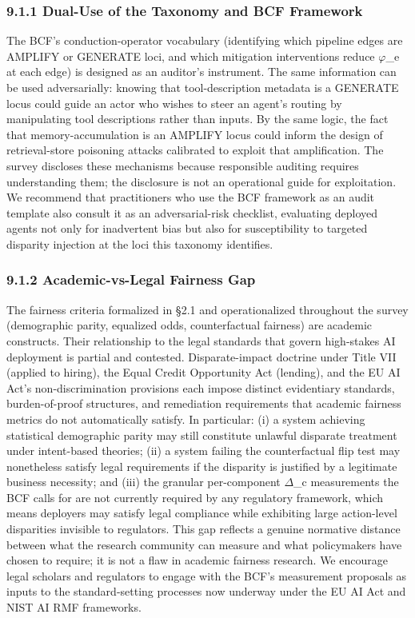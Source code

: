 \documentclass[10pt]{article}
\begin{document}
\subsubsection*{9.1.1 Dual-Use of the Taxonomy and BCF Framework}

The BCF's conduction-operator vocabulary (identifying which pipeline edges are AMPLIFY or GENERATE loci, and which mitigation interventions reduce $\varphi$\_e at each edge) is designed as an auditor's instrument. The same information can be used adversarially: knowing that tool-description metadata is a GENERATE locus \cite{sneh2025tooltweak} could guide an actor who wishes to steer an agent's routing by manipulating tool descriptions rather than inputs. By the same logic, the fact that memory-accumulation is an AMPLIFY locus could inform the design of retrieval-store poisoning attacks \cite{wang2025bias} calibrated to exploit that amplification. The survey discloses these mechanisms because responsible auditing requires understanding them; the disclosure is not an operational guide for exploitation. We recommend that practitioners who use the BCF framework as an audit template also consult it as an adversarial-risk checklist, evaluating deployed agents not only for inadvertent bias but also for susceptibility to targeted disparity injection at the loci this taxonomy identifies.

\subsubsection*{9.1.2 Academic-vs-Legal Fairness Gap}

The fairness criteria formalized in \S{}2.1 and operationalized throughout the survey (demographic parity, equalized odds, counterfactual fairness) are academic constructs. Their relationship to the legal standards that govern high-stakes AI deployment is partial and contested. Disparate-impact doctrine under Title VII (applied to hiring), the Equal Credit Opportunity Act (lending), and the EU AI Act's non-discrimination provisions each impose distinct evidentiary standards, burden-of-proof structures, and remediation requirements that academic fairness metrics do not automatically satisfy. In particular: (i) a system achieving statistical demographic parity may still constitute unlawful disparate treatment under intent-based theories; (ii) a system failing the counterfactual flip test may nonetheless satisfy legal requirements if the disparity is justified by a legitimate business necessity; and (iii) the granular per-component $\Delta$\_c measurements the BCF calls for are not currently required by any regulatory framework, which means deployers may satisfy legal compliance while exhibiting large action-level disparities invisible to regulators. This gap reflects a genuine normative distance between what the research community can measure and what policymakers have chosen to require; it is not a flaw in academic fairness research. We encourage legal scholars and regulators to engage with the BCF's measurement proposals as inputs to the standard-setting processes now underway under the EU AI Act and NIST AI RMF frameworks.
\end{document}

